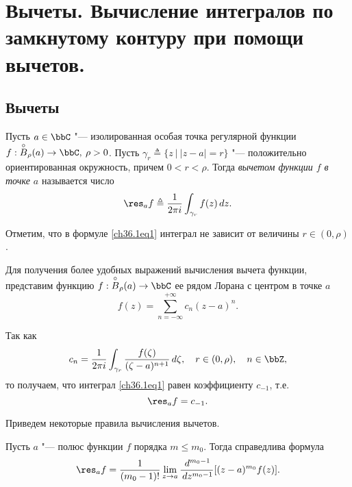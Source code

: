 \chapter{Вычеты. Вычисление интегралов по замкнутому контуру при помощи вычетов.}

\section{Вычеты}

\begin{leftbar}
\begin{defn}
Пусть $a \in \bbC$ "--- изолированная особая точка регулярной функции $f : \overset{\circ}{B}_\rho(a) \to \bbC, \: \rho > 0$. Пусть $\gamma_r \triangleq \{ z \: \big| \: |z - a| = r\}$ "--- положительно ориентированная окружность, причем $0 < r < \rho$. Тогда \textit{вычетом функции $f$ в точке $a$} называется число
\begin{equation} \label{ch36.1eq1}
\res_{a} f \triangleq \frac{1}{2\pi i} \int_{\gamma_r} f(z) \,dz.
\end{equation}
\end{defn}

Отметим, что в формуле \eqref{ch36.1eq1} интеграл не зависит от величины $r\in (0, \rho)$.

Для получения более удобных выражений вычисления вычета функции, представим функцию $f : \overset{\circ}{B}_\rho(a) \to \bbC$ ее рядом Лорана с центром в точке $a$
\begin{equation} \label{ch36.1eq2}
f(z) = \sum_{n = -\infty}^{+\infty} c_n (z - a)^n.
\end{equation}

Так как
$$
c_n = \frac{1}{2\pi i} \int_{\gamma_r} \frac{f(\zeta)}{(\zeta - a)^{n + 1}} \,d\zeta, \quad r \in (0, \rho), \quad n \in \bbZ,
$$
то получаем, что интеграл \eqref{ch36.1eq1} равен коэффициенту $c_{-1}$, т.е.
\begin{equation} \label{ch36.1eq3}
\res_{a} f = c_{-1}.
\end{equation}

Приведем некоторые правила вычисления вычетов.

\begin{lemm} \label{ch36.1lemm1}
Пусть $a$ "--- полюс функции $f$ порядка $m \le m_0$. Тогда справедлива формула
\begin{equation} \label{ch36.1eq4}
\res_{a} f = \frac{1}{(m_0 - 1)!} \lim_{z \to a} \frac{\,d^{m_0 -1}}{\,dz^{m_0 - 1}} [(z - a)^{m_0} f(z)].
\end{equation}
\end{lemm}


\end{leftbar}
